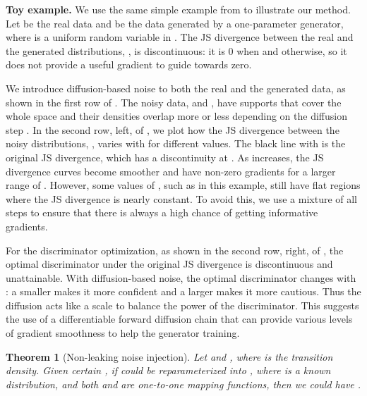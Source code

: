 \documentclass{article} \usepackage{iclr2023_conference,times}
\theoremstyle{plain}
\newtheorem{theorem}{Theorem} \newtheorem{proposition}[theorem]{Proposition}
\theoremstyle{definition}
\theoremstyle{remark}
\begin{document}
\textbf{Toy example. }
We use the same simple example from \citet{arjovsky2017wasserstein} to illustrate our method. Let  be the real data and  be the data generated by a one-parameter generator, where  is a uniform random variable in . The JS divergence between the real and the generated distributions, , is discontinuous: it is 0 when  and  otherwise, so it does not provide a useful gradient to guide  towards zero.




We introduce diffusion-based noise to both the real and the generated data, as shown in the first row of . The noisy data,  and , have supports that cover the whole space  and their densities overlap more or less depending on the diffusion step . In the second row, left, of , we plot how the JS divergence between the noisy distributions, , varies with  for different  values. The black line with  is the original JS divergence, which has a discontinuity at . As  increases, the JS divergence curves become smoother and have non-zero gradients for a larger range of . However, some values of , such as  in this example, still have flat regions where the JS divergence is nearly constant. To avoid this, we use a mixture of all steps to ensure that there is always a high chance of getting informative gradients.





For the discriminator optimization, as shown in the second row, right, of , the optimal discriminator under the original JS divergence is discontinuous and unattainable. With diffusion-based noise, the optimal discriminator changes with : a smaller  makes it more confident and a larger  makes it more cautious. Thus the diffusion acts like a scale to balance the power of the discriminator. This suggests the use of a differentiable forward  diffusion chain that can provide various levels of gradient smoothness to help the generator training.




\begin{theorem}[Non-leaking {noise injection}] \label{theorem:equality}
Let  and , where  is the transition density. Given certain , if  could be reparameterized into , where  is a known distribution, and both  and  are one-to-one mapping functions, then we could have .
\end{theorem}
\end{document}
